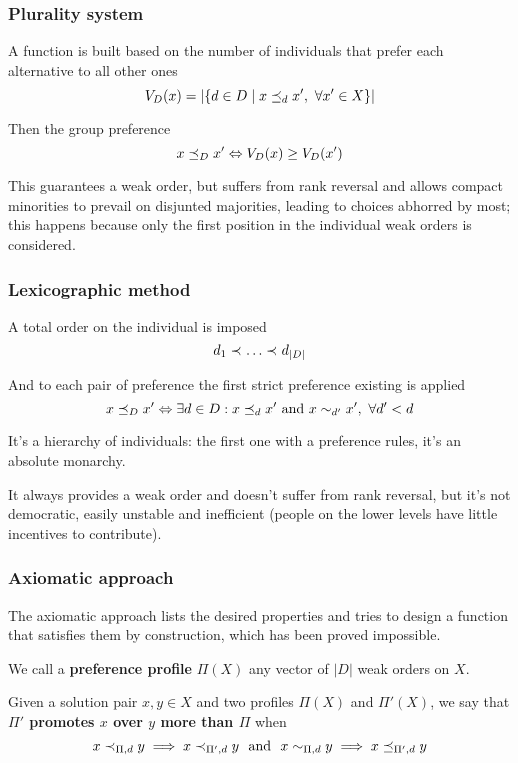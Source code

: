 \subsubsection{Plurality system}

A function is built based on the number of individuals that prefer each alternative to all other ones
$$  V_D (x) = \left|\left\{d \in D \mid x \preceq_{d} x', \ \forall x' \in X\right\}\right|$$

Then the group preference
$$ x \preceq_{D} x' \Leftrightarrow V_D (x) \geq V_D (x') $$

This guarantees a weak order, but suffers from rank reversal and allows compact minorities to prevail on disjunted majorities, leading to choices abhorred by most; this happens because only the first position in the individual weak orders is considered.

\subsubsection{Lexicographic method}

A total order on the individual is imposed
$$ d_1 \pref{} \dots \pref{} d_{|D|} $$

And to each pair of preference the first strict preference existing is applied
$$ x \preceq_{D} x' \Leftrightarrow \exists d \in D : x \preceq_{d} x' \text{ and } x \sim_{d'} x', \ \forall d' < d $$

It's a hierarchy of individuals: the first one with a preference rules, it's an absolute monarchy.

It always provides a weak order and doesn't suffer from rank reversal, but it's not democratic, easily unstable and inefficient (people on the lower levels have little incentives to contribute).

\subsubsection{Axiomatic approach}

The axiomatic approach lists the desired properties and tries to design a function that satisfies them by construction, which has been proved impossible.

We call a \textbf{preference profile} $\Pi (X)$ any vector of $|D|$ weak orders on $X$.

Given a solution pair $x, y \in X$ and two profiles $\Pi (X)$ and $\Pi'(X)$, we say that \textbf{$\Pi'$ promotes $x$ over $y$ more than $\Pi$} when
$$ x \prec_{\Pi, d} y \implies x \prec_{\Pi', d} y \ \text{ and } \ x \sim_{\Pi, d} y \implies x \preceq_{\Pi', d} y $$

